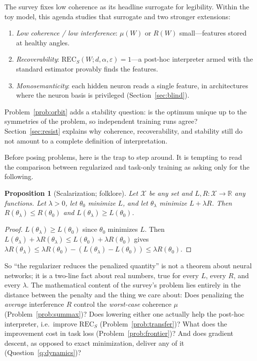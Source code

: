 \documentclass[11pt]{amsart}
\theoremstyle{plain}
\newtheorem{proposition}[theorem]{Proposition}
\theoremstyle{definition}
\newcommand{\R}{\mathbb{R}}
\begin{document}
The survey fixes low coherence as its headline surrogate for legibility. Within the toy model, this agenda studies that surrogate and two stronger extensions:

\begin{enumerate}
\item[(S1)] \emph{Low coherence / low interference}: $\mu(W)$ or $R(W)$ small---features stored at healthy angles.
\item[(S2)] \emph{Recoverability}: $\mathrm{REC}_S(W;d,\alpha,\varepsilon)=1$---a post-hoc interpreter armed with the standard estimator provably finds the features.
\item[(S3)] \emph{Monosemanticity}: each hidden neuron reads a single feature, in architectures where the neuron basis is privileged (Section~\ref{sec:blind}).
\end{enumerate}
Problem~\ref{prob:orbit} adds a stability question: is the optimum unique up to the symmetries of the problem, so independent training runs agree? Section~\ref{sec:resist} explains why coherence, recoverability, and stability still do not amount to a complete definition of interpretation.

Before posing problems, here is the trap to step around. It is tempting to read the comparison between regularized and task-only training as asking only for the following.

\begin{proposition}[Scalarization; folklore]\label{prop:scalar}
Let $\mathcal X$ be any set and $L,R:\mathcal X\to\R$ any functions. Let $\lambda>0$, let $\theta_0$ minimize $L$, and let $\theta_\lambda$ minimize $L+\lambda R$. Then $R(\theta_\lambda)\le R(\theta_0)$ and $L(\theta_\lambda)\ge L(\theta_0)$.
\end{proposition}

\begin{proof}
$L(\theta_\lambda)\ge L(\theta_0)$ since $\theta_0$ minimizes $L$. Then $L(\theta_\lambda)+\lambda R(\theta_\lambda)\le L(\theta_0)+\lambda R(\theta_0)$ gives $\lambda R(\theta_\lambda)\le \lambda R(\theta_0)-(L(\theta_\lambda)-L(\theta_0))\le\lambda R(\theta_0)$.
\end{proof}

So ``the regularizer reduces the penalized quantity'' is not a theorem about neural networks; it is a two-line fact about real numbers, true for every $L$, every $R$, and every $\lambda$. The mathematical content of the survey's problem lies entirely in the distance between the penalty and the thing we care about: Does penalizing the \emph{average} interference $R$ control the \emph{worst-case} coherence $\mu$ (Problem~\ref{prob:summax})? Does lowering either one actually help the post-hoc interpreter, i.e.\ improve $\mathrm{REC}_S$ (Problem~\ref{prob:transfer})? What does the improvement cost in task loss (Problem~\ref{prob:frontier})? And does gradient descent, as opposed to exact minimization, deliver any of it (Question~\ref{q:dynamics})?
\end{document}
